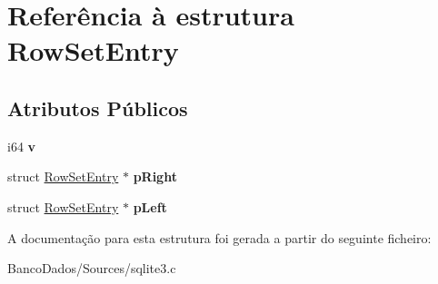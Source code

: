 \hypertarget{struct_row_set_entry}{\section{Referência à estrutura Row\-Set\-Entry}
\label{struct_row_set_entry}
}
\subsection*{Atributos Públicos}
\begin{DoxyCompactItemize}
\item 
\hypertarget{struct_row_set_entry_ac72670935246f1bff5e4d96703574071}{i64 {\bfseries v}}\label{struct_row_set_entry_ac72670935246f1bff5e4d96703574071}

\item 
\hypertarget{struct_row_set_entry_ac39c09525dd24f42af522587d1bc5026}{struct \hyperlink{struct_row_set_entry}{Row\-Set\-Entry} $\ast$ {\bfseries p\-Right}}\label{struct_row_set_entry_ac39c09525dd24f42af522587d1bc5026}

\item 
\hypertarget{struct_row_set_entry_a59365203c30ce782ae38e534c90db14b}{struct \hyperlink{struct_row_set_entry}{Row\-Set\-Entry} $\ast$ {\bfseries p\-Left}}\label{struct_row_set_entry_a59365203c30ce782ae38e534c90db14b}

\end{DoxyCompactItemize}


A documentação para esta estrutura foi gerada a partir do seguinte ficheiro\-:\begin{DoxyCompactItemize}
\item 
Banco\-Dados/\-Sources/sqlite3.\-c\end{DoxyCompactItemize}
